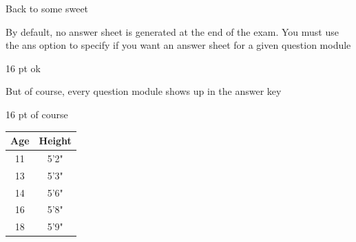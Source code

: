 \documentclass{exam}
\begin{document}
\begin{questions}
	\setcounter{question}{33}
	\question Back to some sweet
	\question By default, no answer sheet is generated at the end of the exam. You must use the ans option to specify if you want an answer sheet for a given question module
		\begin{solution}16 pt
		ok
		\end{solution}
	\question But of course, every question module shows up in the answer key
		\begin{solution}16 pt
		of course
		\end{solution}
\end{questions}
\begin{center}
\def\arraystretch{1.25}
\begin{tabular}{|c|c|}
\hline
	\textbf{Age} & \textbf{Height}\\
	\hline
	11 & 5'2"\\
	13 & 5'3"\\
	14 & 5'6"\\
	16 & 5'8"\\
	18 & 5'9"\\
\hline
\end{tabular}
\end{center}
\end{document}
